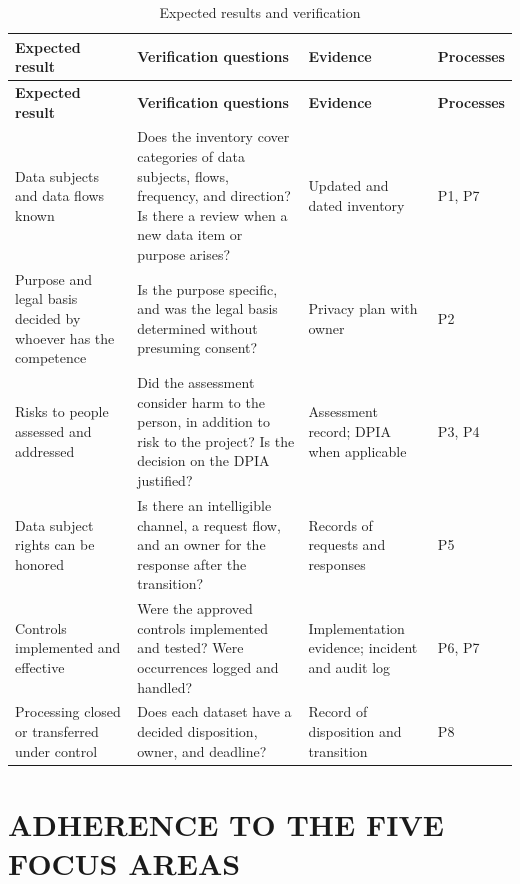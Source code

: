\documentclass[12pt,a4paper,article,oneside,brazil,english]{abntex2}
\makeatletter
\newcommand{\fontetab}[1]{\par\vspace{3pt}{\small\noindent Source: #1\par}}
\newcommand{\refnum}[1]{\csname refnum@#1\endcsname}
\newcommand{\cit}[1]{[\refnum{#1}]}
\makeatother
\begin{document}
\begingroup\SingleSpacing\footnotesize
\begin{longtable}{@{}>{\raggedright\arraybackslash}p{}>{\raggedright\arraybackslash}p{}>{\raggedright\arraybackslash}p{}>{\raggedright\arraybackslash}p{}@{}}
\caption{Expected results and verification}\label{tab:t7}\\
\hline
\textbf{Expected result} & \textbf{Verification questions} & \textbf{Evidence} & \textbf{Processes}\\
\hline
\endfirsthead
\hline
\textbf{Expected result} & \textbf{Verification questions} & \textbf{Evidence} & \textbf{Processes}\\
\hline
\endhead
\hline
\endfoot
\hline
\endlastfoot
Data subjects and data flows known & Does the inventory cover categories of data subjects, flows, frequency, and direction? Is there a review when a new data item or purpose arises? & Updated and dated inventory & P1, P7\\[3pt]
Purpose and legal basis decided by whoever has the competence & Is the purpose specific, and was the legal basis determined without presuming consent? & Privacy plan with owner & P2\\[3pt]
Risks to people assessed and addressed & Did the assessment consider harm to the person, in addition to risk to the project? Is the decision on the DPIA justified? & Assessment record; DPIA when applicable & P3, P4\\[3pt]
Data subject rights can be honored & Is there an intelligible channel, a request flow, and an owner for the response after the transition? & Records of requests and responses & P5\\[3pt]
Controls implemented and effective & Were the approved controls implemented and tested? Were occurrences logged and handled? & Implementation evidence; incident and audit log & P6, P7\\[3pt]
Processing closed or transferred under control & Does each dataset have a decided disposition, owner, and deadline? & Record of disposition and transition & P8\\[3pt]
\end{longtable}
\endgroup
\fontetab{Prepared by the authors (2026), based on \cit{pmi}.}

\section{ADHERENCE TO THE FIVE FOCUS AREAS}
\end{document}
